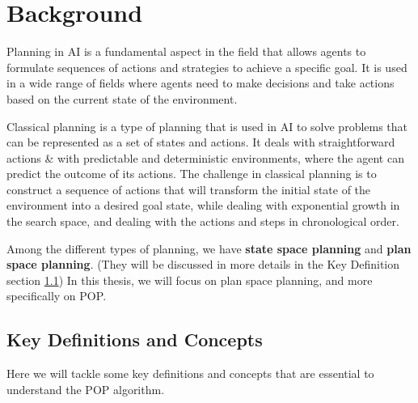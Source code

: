 \chapter{Background}\label{chap:background}
Planning in \acf{AI} is a fundamental aspect in the field that allows agents to formulate sequences of actions and strategies
to achieve a specific goal. It is used in a wide range of fields where agents need to make decisions and take actions based on the
current state of the environment.

Classical planning is a type of planning that is used in \ac{AI} to solve problems that can be represented as a set of states and actions.
It deals with straightforward actions \& with predictable and deterministic environments, where the agent can predict the outcome of its actions.
The challenge in classical planning is to construct a sequence of actions that will transform the initial state
of the environment into a desired goal state, while dealing with exponential growth in the search space, and dealing with the
actions and steps in chronological order.

Among the different types of planning, we have \textbf{state space planning} %
and \textbf{plan space planning}. (They will be discussed in more details in the Key Definition section \ref{sec:key_definitions}) %
In this thesis, we will focus on plan space planning, and more specifically on \acf{POP}.





\section{Key Definitions and Concepts}\label{sec:key_definitions}
Here we will tackle some key definitions and concepts that are essential to understand the \ac{POP} algorithm.

